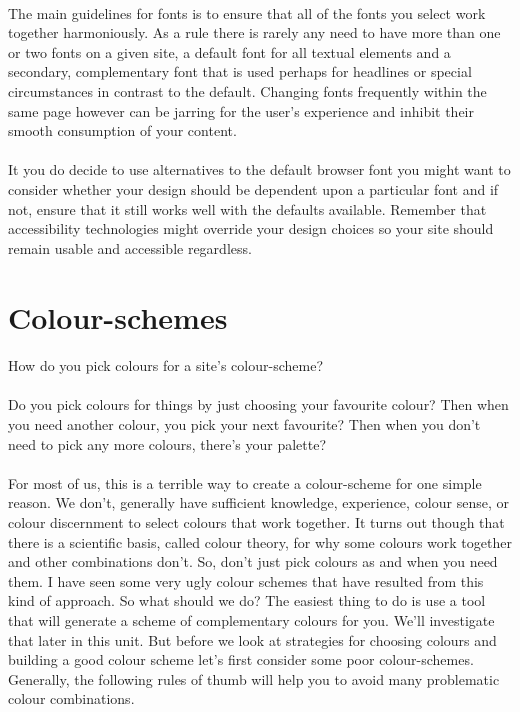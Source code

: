 \paragraph{} The main guidelines for fonts is to ensure that all of the fonts you select work together harmoniously. As a rule there is rarely any need to have more than one or two fonts on a given site, a default font for all textual elements and a secondary, complementary font that is used perhaps for headlines or special circumstances in contrast to the default. Changing fonts frequently within the same page however can be jarring for the user’s experience and inhibit their smooth consumption of your content.
\paragraph{} It you do decide to use alternatives to the default browser font you might want to consider whether your design should be dependent upon a particular font and if not, ensure that it still works well with the defaults available. Remember that accessibility technologies might override your design choices so your site should remain usable and accessible regardless.


\section{Colour-schemes}

\paragraph{} How do you pick colours for a site's colour-scheme?

\paragraph{} Do you pick colours for things by just choosing your favourite colour? Then when you need another colour, you pick your next favourite? Then when you don't need to pick any more colours, there's your palette?

\paragraph{} For most of us, this is a terrible way to create a colour-scheme for one simple reason. We don't, generally have sufficient knowledge, experience, colour sense, or colour discernment to select colours that work together. It turns out though that there is a scientific basis, called colour theory, for why some colours work together and other combinations don't. So, don’t just pick colours as and when you need them. I have seen some very ugly colour schemes that have resulted from this kind of approach. So what should we do? The easiest thing to do is use a tool that will generate a scheme of complementary colours for you. We'll investigate that later in this unit. But before we look at strategies for choosing colours and building a good colour scheme let's first consider some poor colour-schemes. Generally, the following rules of thumb will help you to avoid many problematic colour combinations.

